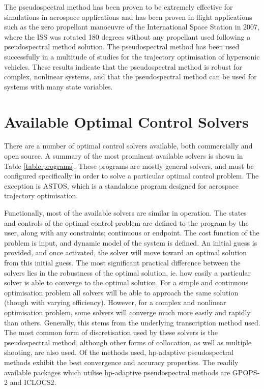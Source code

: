 The pseudospectral method has been proven to be extremely effective for simulations in aerospace applications and has been proven in flight applications such as the zero propellant manoeuvre of the International Space Station in 2007, where the ISS was rotated 180 degrees without any propellant used following a pseudospectral method solution\cite{Bedrossian}. 
The pseudospectral method has been used successfully in a multitude of studies for the trajectory optimisation of hypersonic vehicles\cite{Li2012,Josselyn2002a,Zhao2013,Tian2011,Darby2011,Chai2015,Rizvi2015,Moshman2014,Yang2017,Kodera2014}. 
These results indicate that the pseudospectral method is robust for complex, nonlinear systems, and that the pseudospectral method can be used for systems with many state variables.


\section{Available Optimal Control Solvers}\label{sec:optsolvers}

There are a number of optimal control solvers available, both commercially and open source. A summary of the most prominent available solvers is shown in Table \ref{table:programs}. These programs are mostly general solvers, and must be configured specifically in order to solve a particular optimal control problem. The exception is ASTOS\cite{astos}, which is a standalone program designed for aerospace trajectory optimisation.

Functionally, most of the available solvers are similar in operation. The states and controls of the optimal control problem are defined to the program by the user, along with any constraints; continuous or endpoint. The cost function of the problem is input, and dynamic model of the system is defined. An initial guess is provided, and once activated, the solver will move toward an optimal solution from this initial guess. 
The most significant practical difference between the solvers lies in the robustness of the optimal solution, ie. how easily a particular solver is able to converge to the optimal solution. For a simple and continuous optimisation problem all solvers will be able to approach the same solution (though with varying efficiency). However, for a complex and nonlinear optimisation problem, some solvers will converge much more easily and rapidly than others. Generally, this stems from the underlying transcription method used. 
The most common form of discretisation used by these solvers is the pseudospectral method, although other forms of collocation, as well as multiple shooting, are also used. Of the methods used, \textsf{hp}-adaptive pseudospectral methods exhibit the best convergence and accuracy properties\cite{Chai2015}. The readily available packages which utilise \textsf{hp}-adaptive pseudospectral methods are GPOPS-2\cite{Rao2010} and ICLOCS2\cite{iclocs}.

